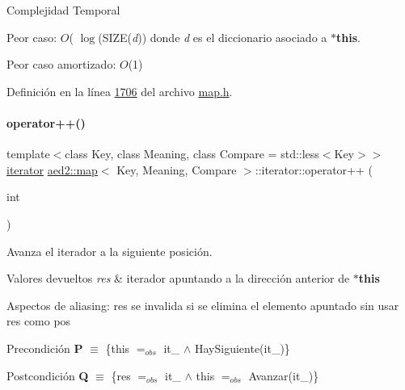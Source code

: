 \begin{DoxyDescription}
\item[Complejidad Temporal]
\begin{DoxyItemize}
\item Peor caso\+: $O$( $\log$(S\+I\+ZE({\itshape d})) donde {\itshape d} es el diccionario asociado a {\bfseries $\ast$this}.
\item Peor caso amortizado\+: $O$(1) 
\end{DoxyItemize}
\end{DoxyDescription}

Definición en la línea \hyperlink{map_8h_source_l01706}{1706} del archivo \hyperlink{map_8h_source}{map.\+h}.

\mbox{\label{classaed2_1_1map_1_1iterator_af4fe5565eb478cfccd254b2ef230b974_af4fe5565eb478cfccd254b2ef230b974}} 
\paragraph{\texorpdfstring{operator++()}{operator++()}\hspace{0.1cm}{\footnotesize\ttfamily [2/2]}}
{\footnotesize\ttfamily template$<$class Key, class Meaning, class Compare = std\+::less$<$\+Key$>$$>$ \\
\hyperlink{classaed2_1_1map_1_1iterator}{iterator} \hyperlink{classaed2_1_1map}{aed2\+::map}$<$ Key, Meaning, Compare $>$\+::iterator\+::operator++ (\begin{DoxyParamCaption}\item[{int}]{ }\end{DoxyParamCaption})\hspace{0.3cm}{\ttfamily [inline]}}



Avanza el iterador a la siguiente posición. 


\begin{DoxyRetVals}{Valores devueltos}
{\em res} & iterador apuntando a la dirección anterior de {\bfseries $\ast$this}\\
\hline
\end{DoxyRetVals}
\begin{DoxyParagraph}{Aspectos de aliasing\+:}
res se invalida si se elimina el elemento apuntado sin usar res como pos
\end{DoxyParagraph}
\begin{DoxyPrecond}{Precondición}
{\bfseries P} $\equiv$ \{this $=_{obs}$ it\+\_ $\land$ Hay\+Siguiente(it\+\_)\} 
\end{DoxyPrecond}
\begin{DoxyPostcond}{Postcondición}
{\bfseries Q} $\equiv$ \{res $=_{obs}$ it\+\_ $\land$ this $=_{obs}$ Avanzar(it\+\_)\}
\end{DoxyPostcond}

